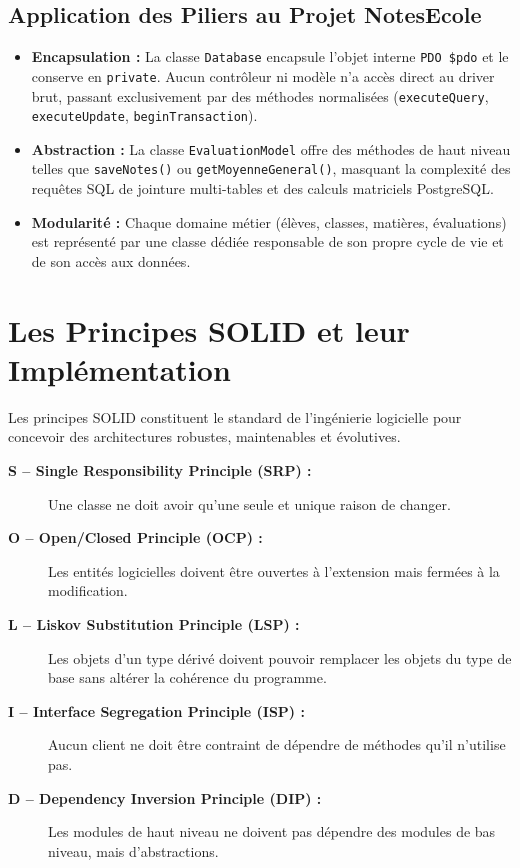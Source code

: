 \documentclass[11pt,a4paper,oneside]{report}
\begin{document}
\subsection{Application des Piliers au Projet NotesEcole}
\begin{itemize}[label=\textcolor{primaryMed}{\textbullet}]
    \item \textbf{Encapsulation :} La classe \texttt{Database} encapsule l'objet interne \texttt{PDO \$pdo} et le conserve en \texttt{private}. Aucun contrôleur ni modèle n'a accès direct au driver brut, passant exclusivement par des méthodes normalisées (\texttt{executeQuery}, \texttt{executeUpdate}, \texttt{beginTransaction}).
    \item \textbf{Abstraction :} La classe \texttt{EvaluationModel} offre des méthodes de haut niveau telles que \texttt{saveNotes()} ou \texttt{getMoyenneGeneral()}, masquant la complexité des requêtes SQL de jointure multi-tables et des calculs matriciels PostgreSQL.
    \item \textbf{Modularité :} Chaque domaine métier (élèves, classes, matières, évaluations) est représenté par une classe dédiée responsable de son propre cycle de vie et de son accès aux données.
\end{itemize}

\section{Les Principes SOLID et leur Implémentation}

Les principes SOLID constituent le standard de l'ingénierie logicielle pour concevoir des architectures robustes, maintenables et évolutives.

\begin{conceptBox}
\begin{description}
    \item[\textbf{S -- Single Responsibility Principle (SRP) :}] Une classe ne doit avoir qu'une seule et unique raison de changer.
    \item[\textbf{O -- Open/Closed Principle (OCP) :}] Les entités logicielles doivent être ouvertes à l'extension mais fermées à la modification.
    \item[\textbf{L -- Liskov Substitution Principle (LSP) :}] Les objets d'un type dérivé doivent pouvoir remplacer les objets du type de base sans altérer la cohérence du programme.
    \item[\textbf{I -- Interface Segregation Principle (ISP) :}] Aucun client ne doit être contraint de dépendre de méthodes qu'il n'utilise pas.
    \item[\textbf{D -- Dependency Inversion Principle (DIP) :}] Les modules de haut niveau ne doivent pas dépendre des modules de bas niveau, mais d'abstractions.
\end{description}
\end{conceptBox}
\end{document}
